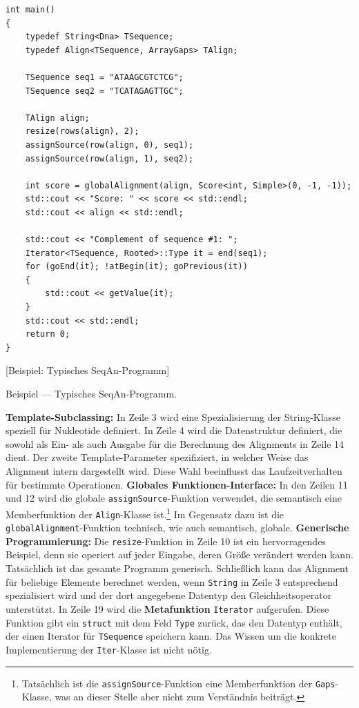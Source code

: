\begin{center}
\begin{verbatim}
int main()
{
    typedef String<Dna> TSequence;
    typedef Align<TSequence, ArrayGaps> TAlign;
    
    TSequence seq1 = "ATAAGCGTCTCG";
    TSequence seq2 = "TCATAGAGTTGC";

    TAlign align;
    resize(rows(align), 2);
    assignSource(row(align, 0), seq1);
    assignSource(row(align, 1), seq2);
    
    int score = globalAlignment(align, Score<int, Simple>(0, -1, -1));
    std::cout << "Score: " << score << std::endl;
    std::cout << align << std::endl;
    
    std::cout << "Complement of sequence #1: ";
    Iterator<TSequence, Rooted>::Type it = end(seq1);
    for (goEnd(it); !atBegin(it); goPrevious(it))
    {
        std::cout << getValue(it);
    }
    std::cout << std::endl;
    return 0;
}    
\end{verbatim}
[Beispiel: Typisches SeqAn-Programm]{Beispiel --- Typisches SeqAn-Programm.

\textbf{Template-Subclassing:} In Zeile 3 wird eine Spezialisierung der String-Klasse speziell für Nukleotide definiert. In Zeile 4 wird die Datenstruktur definiert, die sowohl als Ein- als auch Ausgabe für die Berechnung des Alignments in Zeile 14 dient. Der zweite Template-Parameter spezifiziert, in welcher Weise das Alignment intern dargestellt wird. Diese Wahl beeinflusst das Laufzeitverhalten für bestimmte Operationen. \textbf{Globales Funktionen-Interface:} In den Zeilen 11 und 12 wird die globale \texttt{assignSource}-Funktion verwendet, die semantisch eine Memberfunktion der \texttt{Align}-Klasse ist.\footnote{Tatsächlich ist die \texttt{assignSource}-Funktion eine Memberfunktion der \texttt{Gaps}-Klasse, was an dieser Stelle aber nicht zum Verständnis beiträgt.} Im Gegensatz dazu ist die \texttt{globalAlignment}-Funktion technisch, wie auch semantisch, globale. \textbf{Generische Programmierung:} Die \texttt{resize}-Funktion in Zeile 10 ist ein hervorragendes Beispiel, denn sie operiert auf jeder Eingabe, deren Größe verändert werden kann. Tatsächlich ist das gesamte Programm generisch. Schließlich kann das Alignment für beliebige Elemente berechnet werden, wenn \texttt{String} in Zeile 3 entsprechend spezialisiert wird und der dort angegebene Datentyp den Gleichheitsoperator unterstützt. In Zeile 19 wird die \textbf{Metafunktion} \texttt{Iterator} aufgerufen. Diese Funktion gibt ein \texttt{struct} mit dem Feld \texttt{Type} zurück, das den Datentyp enthält, der einen Iterator für \texttt{TSequence} speichern kann. Das Wissen um die konkrete Implementierung der \texttt{Iter}-Klasse ist nicht nötig.}
\label{lst:seqan-typical}
\end{center}

